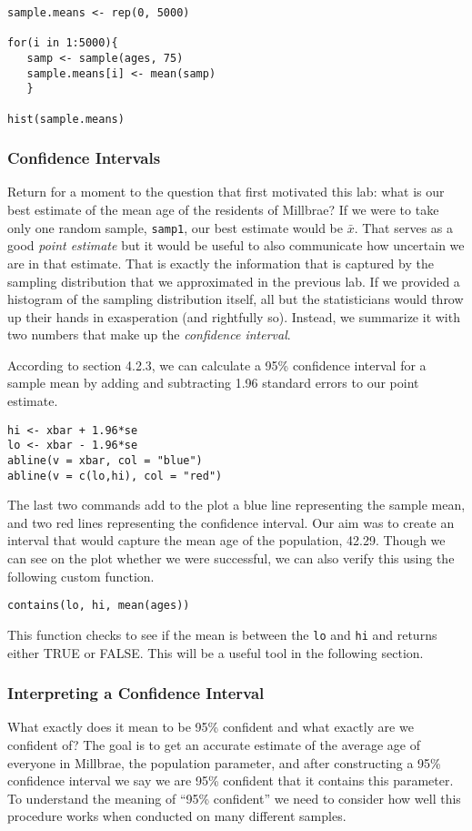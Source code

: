 \documentclass[11pt]{article}
\begin{document}
\begin{lstlisting}
sample.means <- rep(0, 5000)

for(i in 1:5000){
   samp <- sample(ages, 75)
   sample.means[i] <- mean(samp)
   }

hist(sample.means)
\end{lstlisting}

\subsubsection*{Confidence Intervals}
Return for a moment to the question that first motivated this lab: what is our best estimate of the mean age of the residents of Millbrae?  If we were to take only one random sample, \texttt{samp1}, our best estimate would be $\bar{x}$.  That serves as a good \emph{point estimate} but it would be useful to also communicate how uncertain we are in that estimate.  That is exactly the information that is captured by the sampling distribution that we approximated in the previous lab.  If we provided a histogram of the sampling distribution itself, all but the statisticians would throw up their hands in exasperation (and rightfully so).  Instead, we summarize it with two numbers that make up the \emph{confidence interval}.

According to section 4.2.3, we can calculate a 95\% confidence interval for a sample mean by adding and subtracting 1.96 standard errors to our point estimate.

\begin{lstlisting}
hi <- xbar + 1.96*se
lo <- xbar - 1.96*se
abline(v = xbar, col = "blue")
abline(v = c(lo,hi), col = "red")
\end{lstlisting}

The last two commands add to the plot a blue line representing the sample mean, and two red lines representing the confidence interval.  Our aim was to create an interval that would capture the mean age of the population, 42.29.  Though we can see on the plot whether we were successful, we can also verify this using the following custom function.

\begin{lstlisting}
contains(lo, hi, mean(ages))
\end{lstlisting}

This function checks to see if the mean is between the \texttt{lo} and \texttt{hi} and returns either TRUE or FALSE.  This will be a useful tool in the following section.


\subsubsection*{Interpreting a Confidence Interval}
What exactly does it mean to be 95\% confident and what exactly are we confident of?  The goal is to get an accurate estimate of the average age of everyone in Millbrae, the population parameter, and after constructing a 95\% confidence interval we say we are 95\% confident that it contains this parameter.  To understand the meaning of ``95\% confident'' we need to consider how well this procedure works when conducted on many different samples.
\end{document}
